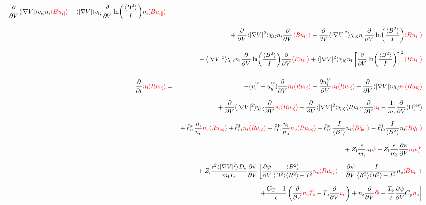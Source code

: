 \documentclass[11pt]{article}
\def\r#1{{\rm#1}}
\def\aves#1{\langle#1\rangle}
\def\dd#1#2{\frac{\partial #1}{\partial #2}}
\def\para{\parallel}
\def\ddV{\frac{\partial}{\partial V}}
\def\mi{m_\r{i}}
\def\nee{n_\r{e}}
\def\ni{n_\r{i}}
\def\nb{n_\r{b}}
\def\Te{T_\r{e}}
\def\Zi{Z_\r{i}}
\def\uezt{u_{\r{e}\zeta}}
\def\uizt{u_{\r{i}\zeta}}
\def\ubzt{u_{\r{b}\zeta}}
\def\uepara{u_{\r{e}\para}}
\def\uipara{u_{\r{i}\para}}
\def\ubpara{u_{\r{b}\para}}
\def\qhatepara{\hat{q}_{\r{e}\para}}
\def\qhatipara{\hat{q}_{\r{i}\para}}
\def\uiV{u_\r{i}^V}
\def\ugV{u_{g}^V}
\def\bri{\aves{B^2}\aves{R^2} - I^2}
\def\ddt{\frac{\partial}{\partial t}}
\def\De{D_\r{e}}
\def\red#1{\textcolor{red}{#1}}
\begin{document}
\begin{eqnarray}
%
  - \ddV \aves{|\nabla V|} v_{\r{i}\zeta} \ni \red{\aves{B \uipara}}
%
  + \aves{|\nabla V|} v_{\r{i}\zeta} \ddV \ln
  \biggl(\frac{\aves{B^2}}{I}\biggl) \ni \red{\aves{B \uipara}}
\nonumber\\[3mm]&&{}
%
  + \ddV \aves{|\nabla V|^2} \chi_{\r{i}\zeta} \ni \ddV \red{\aves{B
  \uipara}}
%
  - \ddV \aves{|\nabla V|^2} \chi_{\r{i}\zeta} \ni \ddV
  \ln\biggl(\frac{\aves{B^2}}{I}\biggr) \red{\aves{B \uipara}}
\nonumber\\[3mm]&&{}
%
  - \aves{|\nabla V|^2} \chi_{\r{i}\zeta} \ni \ddV
  \ln\biggl(\frac{\aves{B^2}}{I}\biggr) \ddV \red{\aves{B
  \uipara}}
%
  + \aves{|\nabla V|^2} \chi_{\r{i}\zeta} \ni \left[\ddV
  \ln\biggl(\frac{\aves{B^2}}{I}\biggr)\right]^2 \red{\aves{B \uipara}}
\\[5mm]
  \ddt \red{\ni \aves{R \uizt}} &=&
%
  - (\uiV - \ugV) \ddV \red{\ni \aves{R \uizt}}
%
  - \dd{\uiV}{V} \red{\ni \aves{R \uizt}}
%
  - \ddV \aves{|\nabla V|} v_{\r{i}\zeta} \red{\ni \aves{R \uizt}}
\nonumber\\[3mm]&&{}
  + \ddV \aves{|\nabla V|^2} \chi_{\r{i}\zeta} \ddV \red{\ni \aves{R \uizt}}
  - \ddV \aves{|\nabla V|^2} \chi_{\r{i}\zeta} \aves{R \uizt}\ddV \red{\ni} 
  - \frac{1}{\mi} \ddV \aves{\Pi_\r{i}^\r{res}}
\nonumber\\[2.5mm]&&{}
%
  + \hat{\ell}_{11}^\r{ie} \frac{\ni}{\nee} \red{\nee \aves{R \uezt}}
  + \hat{\ell}_{11}^\r{ii} \red{\ni \aves{R \uizt}}
  + \hat{\ell}_{11}^\r{ib} \frac{\ni}{\nb} \red{\nb \aves{R \ubzt}}
%
  - \hat{\ell}_{12}^\r{ie} \frac{I}{\aves{B^2}} \ni \red{\aves{B \qhatepara}}
  - \hat{\ell}_{12}^\r{ii} \frac{I}{\aves{B^2}} \ni \red{\aves{B \qhatipara}}
\nonumber\\[2.5mm]&&{}
%
  + \Zi \frac{e}{\mi}              \ni \red{\dot{\psi}}
%
  + \Zi \frac{e}{\mi} \dd{\psi}{V} \red{\ni \uiV}
%
\nonumber\\[2.5mm]&&{}
%
%
  + \Zi \frac{e^2 \aves{|\nabla V|^2} \De}{\mi\Te} \dd{\psi}{V} 
%
    \left[  \dd{\psi}{V} \frac{\aves{B^2}}{\bri} \red{\nee \aves{R \uezt}}
          - \dd{\psi}{V} \frac{I}{\bri} \nee \red{\aves{B \uepara}} \right.
\nonumber\\[2.5mm]&&{}
%
    \left.+ \frac{C_\r{T}-1}{e} \left(\ddV \red{\nee \Te} - \Te \ddV \red{\nee} \right)
	  + \nee \ddV \red{\Phi}
	  + \frac{\Te}{e} \dd{\psi}{V} C_\r{p} \red{\nee} \right]
\nonumber\\[2.5mm]&&{}

\end{eqnarray}
\end{document}
